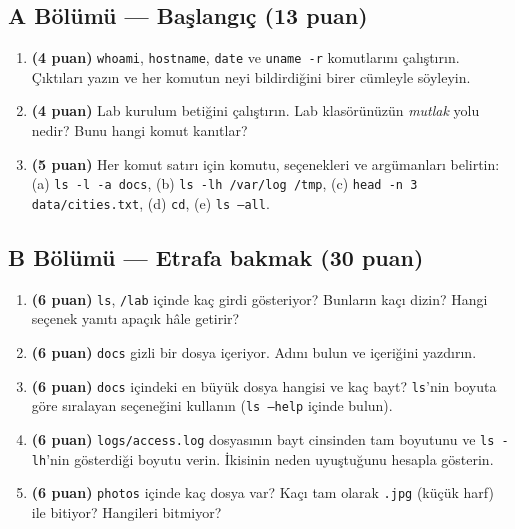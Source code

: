 \documentclass[11pt,a4paper]{article}
\newcommand{\cmd}[1]{\texttt{#1}}
\begin{document}
\subsection*{A Bölümü --- Başlangıç (13 puan)}
\begin{enumerate}[label=\textbf{A\arabic*}, leftmargin=2.2em]
  \item \textbf{(4 puan)} \cmd{whoami}, \cmd{hostname}, \cmd{date} ve \cmd{uname -r} komutlarını çalıştırın. Çıktıları yazın ve her komutun neyi bildirdiğini birer cümleyle söyleyin.
  \item \textbf{(4 puan)} Lab kurulum betiğini çalıştırın. Lab klasörünüzün \emph{mutlak} yolu nedir? Bunu hangi komut kanıtlar?
  \item \textbf{(5 puan)} Her komut satırı için komutu, seçenekleri ve argümanları belirtin: (a) \cmd{ls -l -a docs}, (b) \cmd{ls -lh /var/log /tmp}, (c) \cmd{head -n 3 data/cities.txt}, (d) \cmd{cd}, (e) \cmd{ls --all}.
\end{enumerate}

\subsection*{B Bölümü --- Etrafa bakmak (30 puan)}
\begin{enumerate}[label=\textbf{B\arabic*}, leftmargin=2.2em, start=4]
  \item \textbf{(6 puan)} \cmd{ls}, \texttt{\tl/lab} içinde kaç girdi gösteriyor? Bunların kaçı dizin? Hangi seçenek yanıtı apaçık hâle getirir?
  \item \textbf{(6 puan)} \texttt{docs} gizli bir dosya içeriyor. Adını bulun ve içeriğini yazdırın.
  \item \textbf{(6 puan)} \texttt{docs} içindeki en büyük dosya hangisi ve kaç bayt? \cmd{ls}'nin boyuta göre sıralayan seçeneğini kullanın (\cmd{ls --help} içinde bulun).
  \item \textbf{(6 puan)} \texttt{logs/access.log} dosyasının bayt cinsinden tam boyutunu ve \cmd{ls -lh}'nin gösterdiği boyutu verin. İkisinin neden uyuştuğunu hesapla gösterin.
  \item \textbf{(6 puan)} \texttt{photos} içinde kaç dosya var? Kaçı tam olarak \texttt{.jpg} (küçük harf) ile bitiyor? Hangileri bitmiyor?
\end{enumerate}
\end{document}
